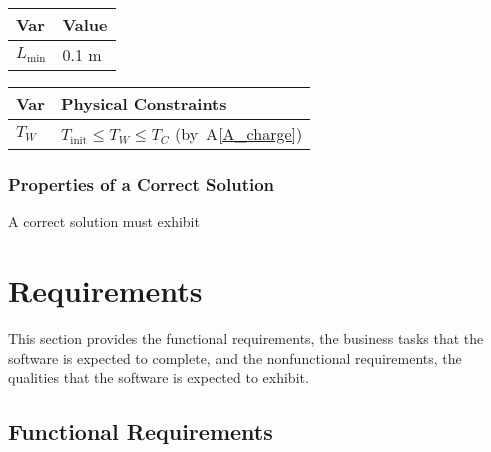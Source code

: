 \documentclass[12pt]{article}
\newcommand{\aref}[1]{A\ref{#1}}
\begin{document}
\begin{table}[!h]
\caption{Specification Parameter Values} \label{TblSpecParams}
\renewcommand{\arraystretch}{1.2}
\noindent \begin{longtable*}{l l} 
  \toprule
  \textbf{Var} & \textbf{Value} \\
  \midrule 
  $L_\text{min}$ & 0.1 \si{\metre}\\
  \bottomrule
\end{longtable*}
\end{table}

\begin{table}[!h]
\caption{Output Variables} \label{TblOutputVar}
\renewcommand{\arraystretch}{1.2}
\noindent \begin{longtable*}{l l} 
  \toprule
  \textbf{Var} & \textbf{Physical Constraints} \\
  \midrule 
  $T_W$ & $T_\text{init} \leq T_W \leq T_C$ (by~\aref{A_charge})
  \\
  \bottomrule
\end{longtable*}
\end{table}

\subsubsection{Properties of a Correct Solution} \label{sec_CorrectSolution}

\noindent
A correct solution must exhibit 

\section{Requirements}
\label{requirements}

This section provides the functional requirements, the business tasks that the
software is expected to complete, and the nonfunctional requirements, the
qualities that the software is expected to exhibit.

\subsection{Functional Requirements}
\end{document}
